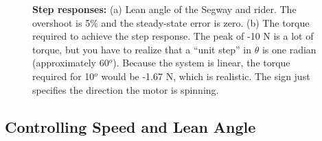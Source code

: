 \begin{figure}[htb]%
\centering
{}%
\hfill%
%
\hfill%
    \caption[]{\textbf{Step responses:} (a) Lean angle of the Segway and rider. The overshoot is 5\% and the steady-state error is zero. (b) The torque required to achieve the step response. The peak of -10 N is a lot of torque, but you have to realize that a ``unit step'' in $\theta$ is one radian (approximately 60$^o$). Because the system is linear, the torque required for 10$^o$ would be -1.67 N, which is realistic. The sign just specifies the direction the motor is spinning.}
    \label{fig:SegwayStepReponsesLeanAngleMotorTorque}
\end{figure}

\bigskip

\FloatBarrier

\subsection{Controlling Speed and Lean Angle}

